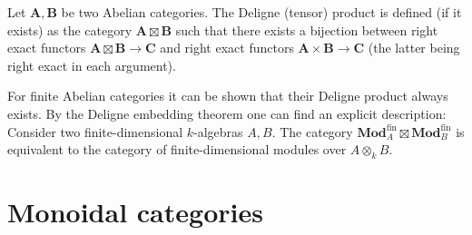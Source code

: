     \begin{construct}
        Let $\mathbf{A}, \mathbf{B}$ be two Abelian categories. The Deligne (tensor) product is defined (if it exists) as the category $\mathbf{A}\boxtimes\mathbf{B}$ such that there exists a bijection between right exact functors $\mathbf{A}\boxtimes\mathbf{B}\rightarrow\mathbf{C}$ and right exact functors $\mathbf{A}\times\mathbf{B}\rightarrow\mathbf{C}$ (the latter being right exact in each argument).

        For finite Abelian categories it can be shown that their Deligne product always exists. By the Deligne embedding theorem one can find an explicit description: Consider two finite-dimensional $k$-algebras $A, B$. The category $\mathbf{Mod}_A^{\text{fin}}\boxtimes\mathbf{Mod}_B^{\text{fin}}$ is equivalent to the category of finite-dimensional modules over $A\otimes_kB$.
    \end{construct}

\section{Monoidal categories}

